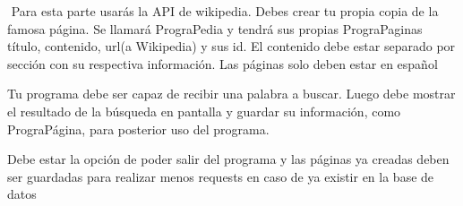 \documentclass{article}
\begin{document}
﻿ Para esta parte usarás 
 la API de wikipedia. 
 Debes crear tu 
 propia copia 
 de la famosa página. 
 Se llamará PrograPedia y tendrá 
 sus propias 
 PrograPaginas título, contenido, url(a Wikipedia) y sus id. 
 El contenido debe 
 estar separado por 
 sección con su respectiva 
 información. 
 Las páginas solo 
 deben estar en español 

Tu programa 
debe ser capaz 
de recibir 
una palabra 
a buscar. 
Luego debe 
mostrar el 
resultado de la 
búsqueda en 
pantalla y guardar su información, como 
PrograPágina, para 
posterior 
uso del 
programa. 

Debe estar la opción 
de poder salir del 
programa y las páginas 
ya creadas deben ser 
guardadas para realizar 
menos requests en caso 
de ya existir en 
la base de datos 
\end{document}
